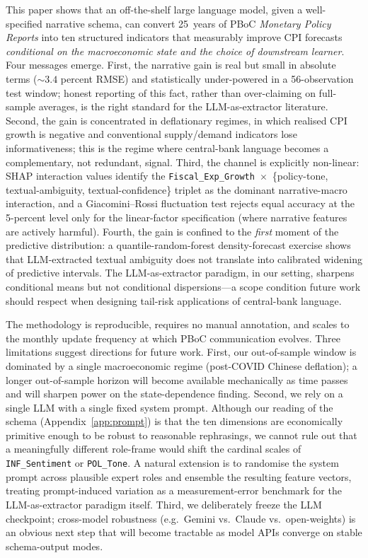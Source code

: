 \documentclass[AER]{AEA}
\begin{document}
This paper shows that an off-the-shelf large language model, given a
well-specified narrative schema, can convert 25~years of PBoC
\emph{Monetary Policy Reports} into ten structured indicators that
measurably improve CPI forecasts \emph{conditional on the macroeconomic
state and the choice of downstream learner}. Four messages emerge. First,
the narrative gain is real but small in absolute terms ($\sim$$3.4$ percent
RMSE) and statistically under-powered in a 56-observation test window;
honest reporting of this fact, rather than over-claiming on full-sample
averages, is the right standard for the LLM-as-extractor literature.
Second, the gain is concentrated in deflationary regimes, in which
realised CPI growth is negative and conventional supply/demand indicators
lose informativeness; this is the regime where central-bank language
becomes a complementary, not redundant, signal. Third, the channel is
explicitly non-linear: SHAP interaction values identify the
\texttt{Fiscal\_Exp\_Growth}~$\times$~\{policy-tone, textual-ambiguity,
textual-confidence\} triplet as the dominant narrative-macro interaction,
and a Giacomini--Rossi fluctuation test rejects equal accuracy at the
5-percent level only for the linear-factor specification (where narrative
features are actively harmful). Fourth, the gain is confined to the
\emph{first} moment of the predictive distribution: a quantile-random-forest
density-forecast exercise shows that LLM-extracted textual ambiguity does
not translate into calibrated widening of predictive intervals. The
LLM-as-extractor paradigm, in our setting, sharpens conditional means but
not conditional dispersions---a scope condition future work should respect
when designing tail-risk applications of central-bank language.

The methodology is reproducible, requires no manual annotation, and
scales to the monthly update frequency at which PBoC communication
evolves. Three limitations suggest directions for future work. First, our
out-of-sample window is dominated by a single macroeconomic regime
(post-COVID Chinese deflation); a longer out-of-sample horizon will become
available mechanically as time passes and will sharpen power on the
state-dependence finding. Second, we rely on a single LLM with a single
fixed system prompt. Although our reading of the schema (Appendix~\ref{app:prompt})
is that the ten dimensions are economically primitive enough to be robust
to reasonable rephrasings, we cannot rule out that a meaningfully
different role-frame would shift the cardinal scales of
\texttt{INF\_Sentiment} or \texttt{POL\_Tone}. A natural extension is to
randomise the system prompt across plausible expert roles and ensemble
the resulting feature vectors, treating prompt-induced variation as a
measurement-error benchmark for the LLM-as-extractor paradigm itself.
Third, we deliberately freeze the LLM checkpoint; cross-model robustness
(e.g.\ Gemini vs.\ Claude vs.\ open-weights) is an obvious next step that
will become tractable as model APIs converge on stable schema-output
modes.
\end{document}
